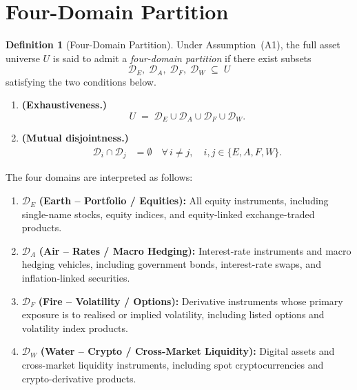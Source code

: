\documentclass[12pt,openany]{book}
\newcommand{\calU}{\mathcal{U}}
\numberwithin{equation}{chapter}
\theoremstyle{plain}
\theoremstyle{definition}
\newtheorem{definition}[theorem]{Definition}
\theoremstyle{remark}
\numberwithin{equation}{chapter}
\theoremstyle{plain}
\def\calU{U}%
\begin{document}
\section{Four-Domain Partition}
\label{sec:four-domain-def}

\begin{definition}[Four-Domain Partition]
\label{def:four-domain}
Under Assumption~(A1), the full asset universe $\calU$ is said to admit
a \emph{four-domain partition} if there exist subsets
\begin{equation}
  \mathcal{D}_E,\; \mathcal{D}_A,\; \mathcal{D}_F,\; \mathcal{D}_W
  \;\subseteq\; \calU
  \label{eq:four-subsets}
\end{equation}
satisfying the two conditions below.

\begin{enumerate}
  \item \textbf{(Exhaustiveness.)}
        \begin{equation}
          \calU \;=\; \mathcal{D}_{E} \cup \mathcal{D}_{A}
                    \cup \mathcal{D}_{F} \cup \mathcal{D}_{W}.
          \label{eq:four-union}
        \end{equation}

  \item \textbf{(Mutual disjointness.)}
        \begin{align}
          \mathcal{D}_i \cap \mathcal{D}_j &= \emptyset
          \quad \forall\, i \neq j,
          \quad i,j \in \{E,A,F,W\}.
          \label{eq:four-disjoint}
        \end{align}
\end{enumerate}

\noindent The four domains are interpreted as follows:
\begin{enumerate}
  \item $\mathcal{D}_E$ \textbf{(Earth -- Portfolio / Equities):}
        All equity instruments, including single-name stocks, equity
        indices, and equity-linked exchange-traded products.

  \item $\mathcal{D}_A$ \textbf{(Air -- Rates / Macro Hedging):}
        Interest-rate instruments and macro hedging vehicles, including
        government bonds, interest-rate swaps, and inflation-linked
        securities.

  \item $\mathcal{D}_F$ \textbf{(Fire -- Volatility / Options):}
        Derivative instruments whose primary exposure is to realised or
        implied volatility, including listed options and volatility
        index products.

  \item $\mathcal{D}_W$ \textbf{(Water -- Crypto / Cross-Market Liquidity):}
        Digital assets and cross-market liquidity instruments, including
        spot cryptocurrencies and crypto-derivative products.
\end{enumerate}
\end{definition}
\end{document}
